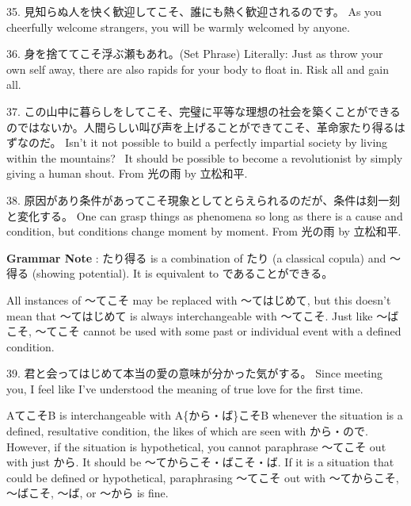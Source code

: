 \par{35. 見知らぬ人を快く歓迎してこそ、誰にも熱く歓迎されるのです。 \hfill\break
As you cheerfully welcome strangers, you will be warmly welcomed by anyone. }

\par{36. 身を捨ててこそ浮ぶ瀬もあれ。(Set Phrase) \hfill\break
Literally: Just as throw your own self away, there are also rapids for your body to float in. \hfill\break
Risk all and gain all. }

\par{37. この山中に暮らしをしてこそ、完璧に平等な理想の社会を築くことができるのではないか。人間らしい叫び声を上げることができてこそ、革命家たり得るはずなのだ。 \hfill\break
Isn't it not possible to build a perfectly impartial society by living within the mountains?  It should be possible to become a revolutionist by simply giving a human shout. \hfill\break
From 光の雨 by 立松和平. }

\par{38. 原因があり条件があってこそ現象としてとらえられるのだが、条件は刻一刻と変化する。 \hfill\break
One can grasp things as phenomena so long as there is a cause and condition, but conditions change moment by moment. \hfill\break
From 光の雨 by 立松和平. }

\par{\textbf{Grammar Note }: たり得る is a combination of たり (a classical copula) and ～得る (showing potential). It is equivalent to であることができる。 }

\par{ All instances of ～てこそ may be replaced with ～てはじめて, but this doesn't mean that ～てはじめて is always interchangeable with ～てこそ. Just like ～ばこそ, ～てこそ cannot be used with some past or individual event with a defined condition. }

\par{39. 君と会ってはじめて本当の愛の意味が分かった気がする。 \hfill\break
Since meeting you, I feel like I've understood the meaning of true love for the first time. }

\par{ AてこそB is interchangeable with A\{から・ば\}こそB whenever the situation is a defined, resultative condition, the likes of which are seen with から・ので. However, if the situation is hypothetical, you cannot paraphrase ～てこそ out with just から. It should be ～てからこそ・ばこそ・ば. If it is a situation that could be defined or hypothetical, paraphrasing ～てこそ out with ～てからこそ, ～ばこそ, ～ば, or ～から is fine. }

